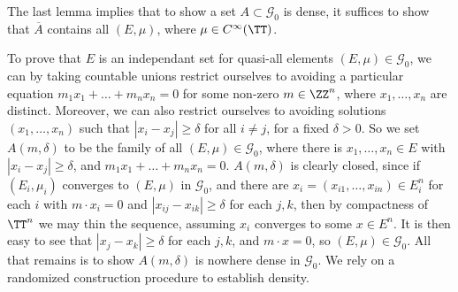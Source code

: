 \begin{remark}
	The last lemma implies that to show a set $A \subset \mathcal{G}_0$ is dense, it suffices to show that $\overline{A}$ contains all $(E,\mu)$, where $\mu \in C^\infty(\TT)$.
\end{remark}

To prove that $E$ is an independant set for quasi-all elements $(E,\mu) \in \mathcal{G}_0$, we can by taking countable unions restrict ourselves to avoiding a particular equation $m_1 x_1 + \dots + m_n x_n = 0$ for some non-zero $m \in \ZZ^n$, where $x_1, \dots, x_n$ are distinct. Moreover, we can also restrict ourselves to avoiding solutions $(x_1, \dots, x_n)$ such that $|x_i - x_j| \geq \delta$ for all $i \neq j$, for a fixed $\delta > 0$. So we set $A(m,\delta)$ to be the family of all $(E,\mu) \in \mathcal{G}_0$, where there is $x_1, \dots, x_n \in E$ with $|x_i - x_j| \geq \delta$, and $m_1 x_1 + \dots + m_n x_n = 0$. $A(m,\delta)$ is clearly closed, since if $(E_i,\mu_i)$ converges to $(E,\mu)$ in $\mathcal{G}_0$, and there are $x_i = (x_{i1}, \dots, x_{in}) \in E_i^n$ for each $i$ with $m \cdot x_i = 0$ and $|x_{ij} - x_{ik}| \geq \delta$ for each $j,k$, then by compactness of $\TT^n$ we may thin the sequence, assuming $x_i$ converges to some $x \in E^n$. It is then easy to see that $|x_j - x_k| \geq \delta$ for each $j,k$, and $m \cdot x = 0$, so $(E,\mu) \in \mathcal{G}_0$. All that remains is to show $A(m,\delta)$ is nowhere dense in $\mathcal{G}_0$. We rely on a randomized construction procedure to establish density.

